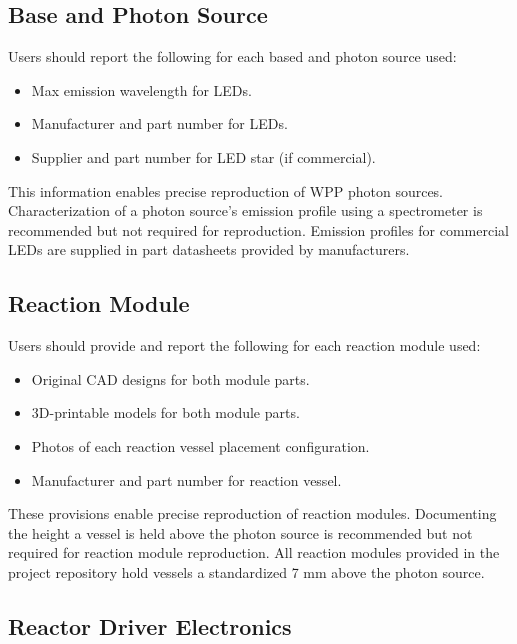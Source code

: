 \documentclass[11pt]{article}
\begin{document}
\subsection{Base and Photon Source} \label{SEC:doc-photon-source}

Users should report the following for each based and photon source used:

\begin{itemize}
	\item Max emission wavelength for LEDs.
	\item Manufacturer and part number for LEDs.
	\item Supplier and part number for LED star (if commercial).
\end{itemize}

This information enables precise reproduction of WPP photon sources. Characterization of a photon source’s emission profile using a spectrometer is recommended but not required for reproduction. Emission profiles for commercial LEDs are supplied in part datasheets provided by manufacturers.

\subsection{Reaction Module} \label{SEC:doc-reaction modules}

Users should provide and report the following for each reaction module used:

\begin{itemize}
	\item Original CAD designs for both module parts.
	\item 3D-printable models for both module parts.
	\item Photos of each reaction vessel placement configuration.
	\item Manufacturer and part number for reaction vessel.
\end{itemize}

These provisions enable precise reproduction of reaction modules. Documenting the height a vessel is held above the photon source is recommended but not required for reaction module reproduction. All reaction modules provided in the project repository hold vessels a standardized 7 mm above the photon source.

\subsection{Reactor Driver Electronics} \label{SEC:doc-reactor-drivers}
\end{document}
